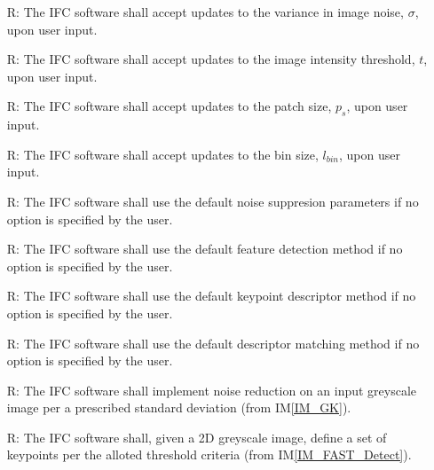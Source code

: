 \documentclass[12pt]{article}
\newcommand{\iref}[1]{IM\ref{#1}}
\newcounter{reqnum} %
\begin{document}
\noindent \begin{itemize}

\item[R\refstepcounter{reqnum}\thereqnum \label{R_Update_SD}:] The IFC software shall accept 
updates to the variance in image noise,  $\mathit{\sigma}$, upon user input.

\item[R\refstepcounter{reqnum}\thereqnum \label{R_Update_Intensity}:] The IFC software shall accept 
updates to the image intensity threshold, $\mathit{t}$, upon user input.

\item[R\refstepcounter{reqnum}\thereqnum \label{R_Update_Patch}:] The IFC software shall accept 
updates to the patch size, $\mathit{p_{s}}$, upon user input.

\item[R\refstepcounter{reqnum}\thereqnum \label{R_Update_BinSize}:] The IFC software shall accept 
updates to the bin size, $\mathit{l_{bin}}$, upon user input.

\item[R\refstepcounter{reqnum}\thereqnum \label{R_Default_Noise}:] The IFC software shall use the 
default noise suppresion parameters if no option is specified by the user.

\item[R\refstepcounter{reqnum}\thereqnum \label{R_Default_FD}:] The IFC software shall use the 
default feature detection method if no option is specified by the user.

\item[R\refstepcounter{reqnum}\thereqnum \label{R_Default_KD}:] The IFC software shall use the 
default keypoint descriptor method if no option is specified by the user.

\item[R\refstepcounter{reqnum}\thereqnum \label{R_Default_FM}:] The IFC software shall use the 
default descriptor matching method if no option is specified by the user.

\item[R\refstepcounter{reqnum}\thereqnum \label{R_NoiseReduction}:] The IFC software shall 
implement noise reduction on an input greyscale image per a prescribed standard deviation (from 
\iref{IM_GK}).

\item[R\refstepcounter{reqnum}\thereqnum \label{R_DetectKeypoints}:] The IFC software shall, given a 2D 
greyscale image, define a set of keypoints per the alloted threshold criteria (from 
\iref{IM_FAST_Detect}).


\end{itemize}
\end{document}
